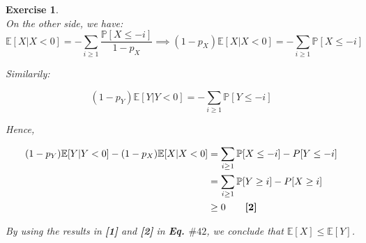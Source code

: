 \documentclass{article}
\newtheorem{exo}{Exercise}
\def\P{\mathbb{P}}
\def\E{\mathbb{E}}
\begin{document}
\begin{exo}{\ \\}
On the other side, we have:
\[
    \E[X|X<0] = -\sum_{i \geq 1} \frac{\P[X \leq -i]}{1-p_X} \implies 
    (1-p_X) \E[X|X<0] = -\sum_{i \geq 1} \P[X \leq -i]
\]

Similarily:

\[
    (1-p_Y) \E[Y|Y<0] = -\sum_{i \geq 1} \P[Y \leq -i]
\]

Hence,

\begin{align*}
     (1-p_Y) \E[Y|Y<0] -  (1-p_X) \E[X|X<0]
     &= \sum_{i \geq 1} \P[X \leq -i] - P[Y \leq -i] \\
     &= \sum_{i \geq 1} \P[Y \geq i] - P[X \geq i] \\
     &\geq 0   \quad \quad \text{\textbf{[2]} }
\end{align*}

By using the results in \textbf{[1]} and \textbf{[2]} in \textbf{Eq. $\#42$}, we conclude that $\E[X] \leq \E[Y]$.
\end{exo}
\end{document}
